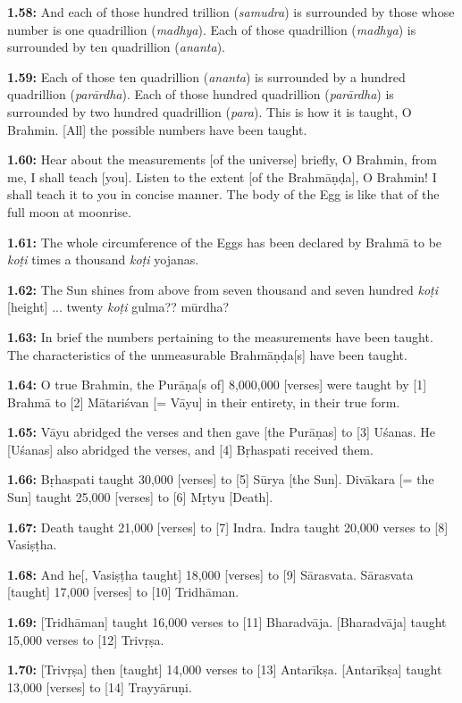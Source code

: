 \documentclass{article}
\newcommand{\vsnum}[1]{\textbf{#1}}
\newcommand{\skt}[1]{\textit{#1}}
\begin{document}
\vsnum{1.58: }And each of those hundred trillion (\skt{samudra}) is surrounded by those whose number is one quadrillion (\skt{madhya}). Each of those quadrillion (\skt{madhya}) is surrounded by ten quadrillion (\skt{ananta}).

\vsnum{1.59: }Each of those ten quadrillion (\skt{ananta}) is surrounded by a hundred quadrillion (\skt{parārdha}). Each of those hundred quadrillion (\skt{parārdha}) is surrounded by two hundred quadrillion (\skt{para}). This is how it is taught, O Brahmin. [All] the possible numbers have been taught.

\vsnum{1.60: }Hear about the measurements [of the universe] briefly, O Brahmin, from me, I shall teach [you]. Listen to the extent [of the Brahmāṇḍa], O Brahmin! I shall teach it to you in concise manner. The body of the Egg is like that of the full moon at moonrise.

\vsnum{1.61: }The whole circumference of the Eggs has been declared by Brahmā to be \skt{koṭi} times a thousand \skt{koṭi} yojanas.

\vsnum{1.62: }The Sun shines from above from seven thousand and seven hundred \skt{koṭi} [height] ... twenty \skt{koṭi} gulma?? mūrdha?

\vsnum{1.63: }In brief the numbers pertaining to the measurements have been taught. The characteristics of the unmeasurable Brahmāṇḍa[s] have been taught.

\vsnum{1.64: }O true Brahmin, the Purāṇa[s of] 8,000,000 [verses] were taught by [1] Brahmā to [2] Mātariśvan [= Vāyu] in their entirety, in their true form.

\vsnum{1.65: }Vāyu abridged the verses and then gave [the Purāṇas] to [3] Uśanas. He [Uśanas] also abridged the verses, and [4] Bṛhaspati received them.

\vsnum{1.66: }Bṛhaspati taught 30,000 [verses] to [5] Sūrya [the Sun]. Divākara [= the Sun] taught 25,000 [verses] to [6] Mṛtyu [Death].

\vsnum{1.67: }Death taught 21,000 [verses] to [7] Indra. Indra taught 20,000 verses to [8] Vasiṣṭha.

\vsnum{1.68: }And he[, Vasiṣṭha taught] 18,000 [verses] to [9] Sārasvata. Sārasvata [taught] 17,000 [verses] to [10] Tridhāman.

\vsnum{1.69: }[Tridhāman] taught 16,000 verses to [11] Bharadvāja. [Bharadvāja] taught 15,000 verses to [12] Trivṛṣa.

\vsnum{1.70: }[Trivṛṣa] then [taught] 14,000 verses to [13] Antarīkṣa. [Antarīkṣa] taught 13,000 [verses] to [14] Trayyāruṇi.
\end{document}
